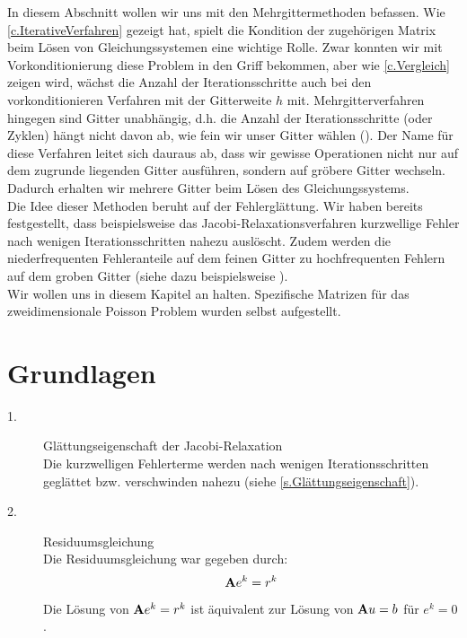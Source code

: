 In diesem Abschnitt wollen wir uns mit den Mehrgittermethoden befassen. Wie \autoref{c.IterativeVerfahren} gezeigt hat, spielt die Kondition der zugehörigen Matrix beim Lösen von Gleichungssystemen eine wichtige Rolle. Zwar konnten wir mit Vorkonditionierung diese Problem in den Griff bekommen, aber wie \autoref{c.Vergleich} zeigen wird, wächst die Anzahl der Iterationsschritte auch bei den vorkonditionieren Verfahren mit der Gitterweite $h$ mit. Mehrgitterverfahren hingegen sind Gitter unabhängig, d.h. die Anzahl der Iterationsschritte (oder Zyklen) hängt nicht davon ab, wie fein wir unser Gitter wählen (\cite[S. 407]{SAAD03}). Der Name für diese Verfahren leitet sich dauraus ab, dass wir gewisse Operationen nicht nur auf dem zugrunde liegenden Gitter ausführen, sondern auf gröbere Gitter wechseln. Dadurch erhalten wir mehrere Gitter beim Lösen des Gleichungssystems.\\
Die Idee dieser Methoden beruht auf der Fehlerglättung. Wir haben bereits festgestellt, dass beispielsweise das Jacobi-Relaxationsverfahren kurzwellige Fehler nach wenigen Iterationsschritten nahezu auslöscht. Zudem werden die niederfrequenten Fehleranteile auf dem feinen Gitter zu hochfrequenten Fehlern auf dem groben Gitter (siehe dazu beispielsweise \cite[S. 661-676]{STR10}).\\
Wir wollen uns in diesem Kapitel an \cite[S. 419-429]{SAAD03} halten. Spezifische Matrizen für das zweidimensionale Poisson Problem wurden selbst aufgestellt.

\section{Grundlagen}\label{s.Idee MGM}

\begin{description}

\item[1.] Glättungseigenschaft der Jacobi-Relaxation \\
Die kurzwelligen Fehlerterme werden nach wenigen Iterationsschritten geglättet bzw. verschwinden nahezu (siehe \autoref{s.Glättungseigenschaft}).
\item[2.] Residuumsgleichung \\
Die Residuumsgleichung war gegeben durch:
\begin{equation}
{\textbf{A}} e^{k} = r^{k}
\end{equation}
Die Lösung von ${\textbf{A}} e^{k} = r^{k}$ ist äquivalent zur Lösung von ${\textbf{A}}u=b$ für $e^{k} = 0$.

\end{description}

